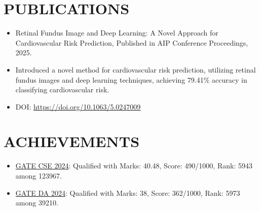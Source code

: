 \documentclass[a4paper,11pt]{article}
\newcommand{\linktext}[2]{{\color{linkcolor}\href{#1}{#2}}}
\begin{document}
\section*{PUBLICATIONS}
\begin{itemize}
    \item Retinal Fundus Image and Deep Learning: A Novel Approach for
    Cardiovascular Risk Prediction, Published in AIP Conference Proceedings,
    2025.
    \item Introduced a novel method for cardiovascular risk prediction,
    utilizing retinal fundus images and deep learning techniques, achieving
    79.41\% accuracy in classifying cardiovascular risk.
    \item DOI: \linktext{https://doi.org/10.1063/5.0247009}{https://doi.org/10.1063/5.0247009}
\end{itemize}
\vspace{-0.1cm}
\section*{ACHIEVEMENTS}
\begin{itemize}
    \item \linktext{https://drive.google.com/file/d/119HcGj2dlvhP-H1cSROeO51gGnfPOQP5/view}{GATE CSE 2024}: Qualified with Marks: 40.48, Score: 490/1000, Rank: 5943 among 123967.
    \item \linktext{https://drive.google.com/file/d/1G_rEs7Rse5fOASrs1HE2DaDU_To_P00e/view}{GATE DA 2024}: Qualified with Marks: 38, Score: 362/1000, Rank: 5973 among 39210.
\end{itemize}
\end{document}
